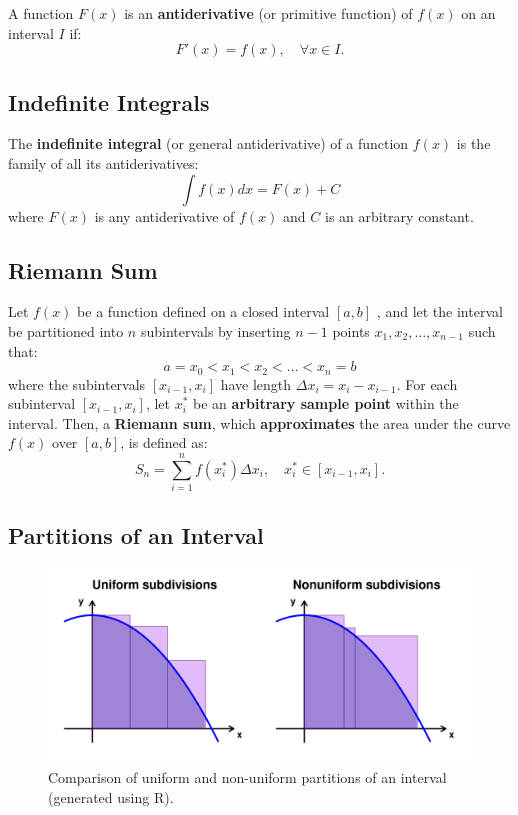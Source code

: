 \documentclass[a4paper,11pt]{article}
\begin{document}
\begin{tcolorbox}
    A function $F(x)$ is an \textbf{antiderivative} (or primitive function) of $f(x)$ on an interval $I$ if:
    \[ F'(x) = f(x), \quad \forall x \in I. \]
\end{tcolorbox}




\subsection{Indefinite Integrals}

\begin{tcolorbox}
    The \textbf{indefinite integral} (or general antiderivative) of a function $f(x)$ is the family of all its antiderivatives:
    \[ \int f(x) dx = F(x) + C \]
    where $F(x)$ is any antiderivative of $f(x)$ and $C$ is an arbitrary constant.
\end{tcolorbox}



\subsection{Riemann Sum}

\begin{tcolorbox}
    Let $f(x)$ be a function defined on a closed interval $[a,b]$ , and let the interval be partitioned into $n$ subintervals by inserting $n-1$ points $x_1, x_2, \dots, x_{n-1}$ such that:
    \[
    a = x_0 < x_1 < x_2 < \dots < x_{n} = b
    \]
    where the subintervals $[x_{i-1}, x_i]$ have length $\Delta x_i = x_i - x_{i-1}$. For each subinterval $[x_{i-1}, x_i]$, let $x_i^*$  be an \textbf{arbitrary sample point} within the interval. Then, a \textbf{Riemann sum}, which \textbf{approximates} the area under the curve $f(x)$ over $[a,b]$, is defined as:
    \[
    S_n = \sum_{i=1}^n f(x_i^*) \Delta x_i, \quad x_i^* \in [x_{i-1}, x_i].
    \]
\end{tcolorbox}



\subsection{Partitions of an Interval}

\begin{figure}[htbp]
    \centering
    \includegraphics[width=\textwidth]{types-of-partitions.png} 
    \caption{Comparison of uniform and non-uniform partitions of an interval (generated using R).}
    \label{fig:discontinuity}
\end{figure}
\end{document}
